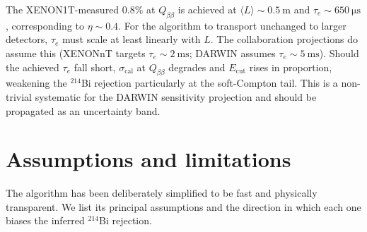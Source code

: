 \documentclass[11pt,a4paper]{article}
\begin{document}
The XENON1T-measured $0.8\%$ at $Q_{\beta\beta}$ is achieved at
$\langle L\rangle \sim \SI{0.5}{\meter}$ and $\tau_e \sim
\SI{650}{\micro\second}$, corresponding to $\eta \sim 0.4$. For the
algorithm to transport unchanged to larger detectors, $\tau_e$ must
scale at least linearly with $L$. The collaboration projections do
assume this (XENONnT targets $\tau_e \sim \SI{2}{\milli\second}$;
DARWIN assumes $\tau_e \sim \SI{5}{\milli\second}$). Should the
achieved $\tau_e$ fall short, $\sigma_{\mathrm{cal}}$ at
$Q_{\beta\beta}$ degrades and $E_{\mathrm{cut}}$ rises in
proportion, weakening the $^{214}$Bi rejection particularly at the
soft-Compton tail. This is a non-trivial systematic for the DARWIN
sensitivity projection and should be propagated as an uncertainty
band.

\section{Assumptions and limitations}

The algorithm has been deliberately simplified to be fast and
physically transparent. We list its principal assumptions and the
direction in which each one biases the inferred $^{214}$Bi rejection.
\end{document}
